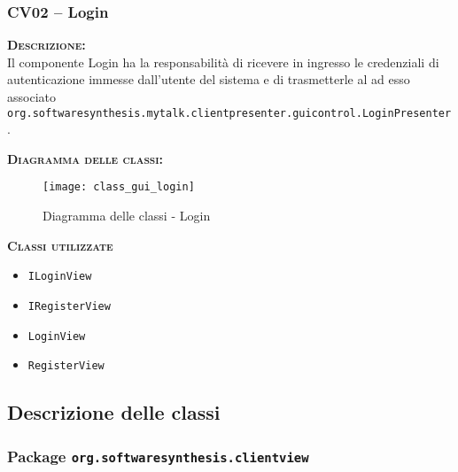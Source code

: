 \subsubsection{CV02 -- Login}\label{sec:cv02}
\begin{description}
  \item{\scshape\bfseries Descrizione:}\\
Il componente \textsf{Login} ha la responsabilità di ricevere in ingresso le credenziali di autenticazione immesse dall'utente del sistema e di trasmetterle al  ad esso associato \texttt{org.softwaresynthesis.mytalk.clientpresenter.guicontrol.LoginPresenter}.

	\item{\scshape\bfseries Diagramma delle classi:}
  \begin{figure}[H]
    \centering
    \texttt{[image: class\_gui\_login]}
    \caption{Diagramma delle classi - Login}\label{fig:login}
  \end{figure}

  \item{\scshape\bfseries Classi utilizzate}
  \begin{itemize}[noitemsep,nolistsep]
  	\item \texttt{ILoginView}
    \item \texttt{IRegisterView}
    \item \texttt{LoginView}
    \item \texttt{RegisterView}
  \end{itemize}

\end{description}

\subsection{Descrizione delle classi}

\subsubsection{Package \texttt{org.softwaresynthesis.clientview}}

